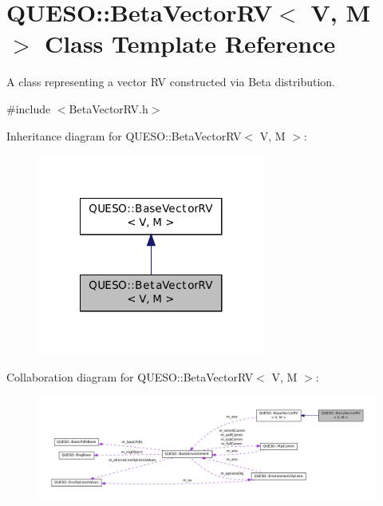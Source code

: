 \hypertarget{class_q_u_e_s_o_1_1_beta_vector_r_v}{\section{Q\-U\-E\-S\-O\-:\-:Beta\-Vector\-R\-V$<$ V, M $>$ Class Template Reference}
\label{class_q_u_e_s_o_1_1_beta_vector_r_v}
}


A class representing a vector R\-V constructed via Beta distribution.  




{\ttfamily \#include $<$Beta\-Vector\-R\-V.\-h$>$}



Inheritance diagram for Q\-U\-E\-S\-O\-:\-:Beta\-Vector\-R\-V$<$ V, M $>$\-:
\nopagebreak
\begin{figure}[H]
\begin{center}
\leavevmode
\includegraphics[width=212pt]{class_q_u_e_s_o_1_1_beta_vector_r_v__inherit__graph}
\end{center}
\end{figure}


Collaboration diagram for Q\-U\-E\-S\-O\-:\-:Beta\-Vector\-R\-V$<$ V, M $>$\-:
\nopagebreak
\begin{figure}[H]
\begin{center}
\leavevmode
\includegraphics[width=350pt]{class_q_u_e_s_o_1_1_beta_vector_r_v__coll__graph}
\end{center}
\end{figure}

